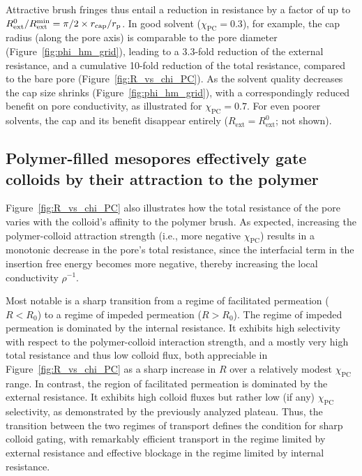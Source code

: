 \documentclass[12pt, a4paper]{article}
\begin{document}
Attractive brush fringes thus entail a reduction in resistance by a factor of up to $R_\text{ext}^0 / R_\text{ext}^\text{\text{min}} = \pi/2 \times r_\text{cap}/r_\text{p}$.
In good solvent ($\chi_\text{PC} = 0.3$), for example, the cap radius (along the pore axis) is comparable to the pore diameter (Figure~\ref{fig:phi_hm_grid}), leading to a 3.3-fold reduction of the external resistance, and a cumulative 10-fold reduction of the total resistance, compared to the bare pore (Figure~\ref{fig:R_vs_chi_PC}).
As the solvent quality decreases the cap size shrinks (Figure~\ref{fig:phi_hm_grid}), with a correspondingly reduced benefit on pore conductivity, as illustrated for $\chi_\text{PC} = 0.7$.
For even poorer solvents, the cap and its benefit disappear entirely ($R_\text{ext} = R_\text{ext}^0$; not shown).


\subsection{Polymer-filled mesopores effectively gate colloids by their attraction to the polymer}

Figure~\ref{fig:R_vs_chi_PC} also illustrates how the total resistance of the pore varies with the colloid's affinity to the polymer brush.
As expected, increasing the polymer-colloid attraction strength (i.e., more negative $\chi_{\text{PC}}$) results in a monotonic decrease in the pore's total resistance, since the interfacial term in the insertion free energy becomes more negative, thereby increasing the local conductivity $\rho^{-1}$.

Most notable is a sharp transition from a regime of facilitated permeation ($R < R_0$) to a regime of impeded permeation ($R > R_0$).
The regime of impeded permeation is dominated by the internal resistance.
It exhibits high selectivity with respect to the polymer-colloid interaction strength, and a mostly very high total resistance and thus low colloid flux, both appreciable in Figure~\ref{fig:R_vs_chi_PC} as a sharp increase in $R$ over a relatively modest $\chi_{\text{PC}}$ range.
In contrast, the region of facilitated permeation is dominated by the external resistance. 
It exhibits high colloid fluxes but rather low (if any) $\chi_{\text{PC}}$ selectivity, as demonstrated by the previously analyzed plateau.
Thus, the transition between the two regimes of transport defines the condition for sharp colloid gating, with remarkably efficient transport in the regime limited by external resistance and effective blockage in the regime limited by internal resistance.
\end{document}
